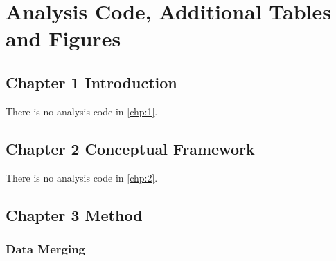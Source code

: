 \chapter{Analysis Code, Additional Tables and Figures}

\begin{singlespace}

\section{Chapter 1 Introduction}

There is no analysis code in \cref{chp:1}.

\section{Chapter 2 Conceptual Framework}

There is no analysis code in \cref{chp:2}.

\section{Chapter 3 Method}

%

%

%

\subsection{Data Merging} \label{R.reimport}





\end{singlespace}
